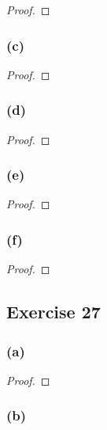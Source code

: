 \documentclass[14pt]{extarticle}
\begin{document}
\begin{proof}

\end{proof}

\subsubsection{(c)}

\begin{proof}

\end{proof}

\subsubsection{(d)}

\begin{proof}

\end{proof}

\subsubsection{(e)}

\begin{proof}

\end{proof}

\subsubsection{(f)}

\begin{proof}

\end{proof}

\subsection{Exercise 27}

\subsubsection{(a)}

\begin{proof}

\end{proof}

\subsubsection{(b)}
\end{document}

